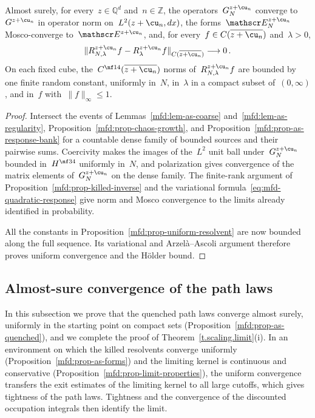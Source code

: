 \documentclass[11pt]{amsart}
\begin{document}
\begin{proposition}
\label{mfd:prop-as-forms}
Almost surely, for every~$z\in\mathbb Q^d$ and~$n\in\mathbb Z$, the operators~$G_N^{z+\cu_n}$ converge to~$G^{z+\cu_n}$ in operator norm on~$L^2(z+\cu_n,dx)$, the forms~$\mathscr E_N^{z+\cu_n}$ Mosco-converge to~$\mathscr E^{z+\cu_n}$, and, for every~$f\in C(\overline{z+\cu_n})$ and~$\lambda>0$,
\begin{equation*}
	\|R^{z+\cu_n}_{N,\lambda}f-R^{z+\cu_n}_\lambda f\|_{C(\overline{z+\cu_n})}\longrightarrow0\,.
\end{equation*}
On each fixed cube, the~$C^{\nf14}(\overline{z+\cu_n})$ norms of~$R^{z+\cu_n}_{N,\lambda}f$ are bounded by one finite random constant, uniformly in~$N$, in~$\lambda$ in a compact subset of~$(0,\infty)$, and in~$f$ with~$\|f\|_\infty\leq1$.
\end{proposition}
\begin{proof}
Intersect the events of Lemmas~\ref{mfd:lem-as-coarse} and~\ref{mfd:lem-as-regularity}, Proposition~\ref{mfd:prop-chaos-growth}, and Proposition~\ref{mfd:prop-as-response-bank} for a countable dense family of bounded sources and their pairwise sums. Coercivity makes the images of the~$L^2$ unit ball under~$G_N^{z+\cu_n}$ bounded in~$H^{\nf34}$ uniformly in~$N$, and polarization gives convergence of the matrix elements of~$G_N^{z+\cu_n}$ on the dense family. The finite-rank argument of Proposition~\ref{mfd:prop-killed-inverse} and the variational formula~\eqref{eq:mfd-quadratic-response} give norm and Mosco convergence to the limits already identified in probability.

\smallskip

All the constants in Proposition~\ref{mfd:prop-uniform-resolvent} are now bounded along the full sequence. Its variational and Arzel\`a--Ascoli argument therefore proves uniform convergence and the H\"older bound.
\end{proof}

\subsection{Almost-sure convergence of the path laws}
\label{mfd:sec-as-paths}

In this subsection we prove that the quenched path laws converge almost surely, uniformly in the starting point on compact sets (Proposition~\ref{mfd:prop-as-quenched}), and we complete the proof of Theorem~\ref{t.scaling.limit}(i). In an environment on which the killed resolvents converge uniformly (Proposition~\ref{mfd:prop-as-forms}) and the limiting kernel is continuous and conservative (Proposition~\ref{mfd:prop-limit-properties}), the uniform convergence transfers the exit estimates of the limiting kernel to all large cutoffs, which gives tightness of the path laws. Tightness and the convergence of the discounted occupation integrals then identify the limit.
\end{document}

